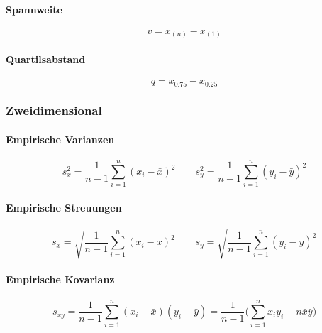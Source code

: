 \documentclass[a4paper, 11pt, accentcolor = tud3b]{tudreport}
\begin{document}
                    \paragraph{Spannweite}
                    \begin{equation*}
	                    v = x_{(n)} - x_{(1)}
                    \end{equation*}
                    
                    \paragraph{Quartilsabstand}
                    \begin{equation*}
	                    q = x_{0.75} - x_{0.25}
                    \end{equation*}

                \subsubsection{Zweidimensional}
                    \paragraph{Empirische Varianzen}
                    \begin{equation*}
	                    s_x^2 = \frac{1}{n - 1} \sum_{i = 1}^{n} (x_i - \bar{x})^2 \qquad s_y^2 = \frac{1}{n - 1} \sum_{i = 1}^{n} (y_i - \bar{y})^2
                    \end{equation*}
                    
                    \paragraph{Empirische Streuungen}
                    \begin{equation*}
	                    s_x = \sqrt{\frac{1}{n - 1} \sum_{i = 1}^{n} (x_i - \bar{x})^2} \qquad s_y = \sqrt{\frac{1}{n - 1} \sum_{i = 1}^{n} (y_i - \bar{y})^2}
                    \end{equation*}
                    
                    \paragraph{Empirische Kovarianz}
                    \begin{equation*}
	                    s_{xy} = \frac{1}{n - 1} \sum_{i = 1}^{n} (x_i - \bar{x}) (y_i - \bar{y}) = \frac{1}{n - 1} \Bigg( \sum_{i = 1}^n x_i y_i - n\bar{x}\bar{y} \Bigg)
                    \end{equation*}
                    
\end{document}
